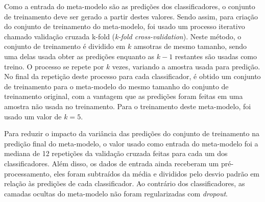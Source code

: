 Como a entrada do meta-modelo são as predições dos classificadores, o conjunto de treinamento deve ser gerado a partir destes valores. Sendo assim, para criação do conjunto de treinamento do meta-modelo, foi usado um processo iterativo chamado validação cruzada k-fold (\emph{k-fold cross-validation}). Neste método, o conjunto de treinamento é dividido em $k$ amsotras de mesmo tamanho, sendo uma delas usada obter as predições enquanto as $k-1$ restantes são usadas como treino. O processo se repete por $k$ vezes, variando a amostra usada para predição. No final da repetição deste processo para cada classificador, é obtido um conjunto de treinamento para o meta-modelo do mesmo tamanho do conjunto de treinamento original, com a vantagem que as predições foram feitas em uma amostra não usada no treinamento. Para o treinamento deste meta-modelo, foi usado um valor de $k=5$.

Para reduzir o impacto da variância das predições do conjunto de treinamento na predição final do meta-modelo, o valor usado como entrada do meta-modelo foi a mediana de 12 repetições da validação cruzada feitas para cada um dos classificadores. Além disso, os dados de entrada ainda receberam um pré-processamento, eles foram subtraídos da média e divididos pelo desvio padrão em relação às predições de cada classificador. Ao contrário dos classificadores, as camadas ocultas do meta-modelo não foram regularizadas com \emph{dropout}.

